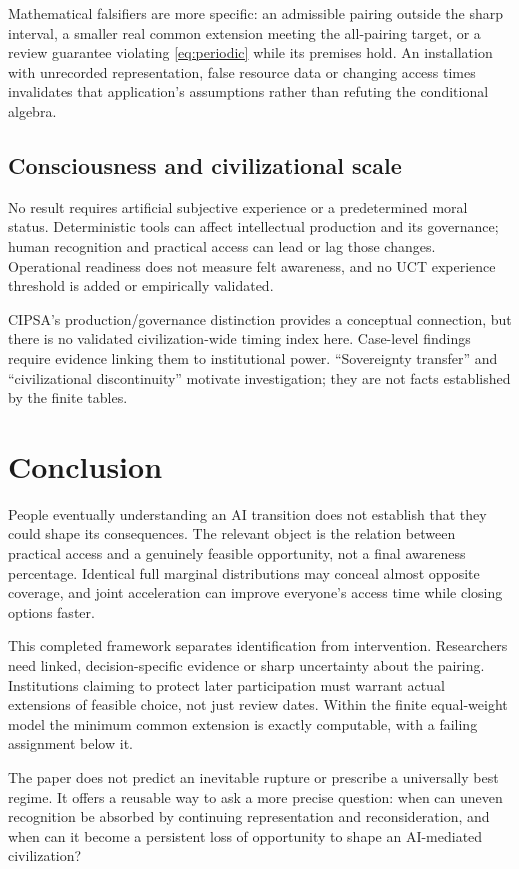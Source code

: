 \documentclass[11pt,a4paper]{article}
\theoremstyle{definition}\newtheorem{definition}{Definition}
\begin{document}
Mathematical falsifiers are more specific: an admissible pairing outside the sharp interval, a smaller real common extension meeting the all-pairing target, or a review guarantee violating \cref{eq:periodic} while its premises hold. An installation with unrecorded representation, false resource data or changing access times invalidates that application's assumptions rather than refuting the conditional algebra.

\subsection{Consciousness and civilizational scale}
No result requires artificial subjective experience or a predetermined moral status. Deterministic tools can affect intellectual production and its governance; human recognition and practical access can lead or lag those changes. Operational readiness does not measure felt awareness, and no UCT experience threshold is added or empirically validated.

CIPSA's production/governance distinction provides a conceptual connection, but there is no validated civilization-wide timing index here. Case-level findings require evidence linking them to institutional power. ``Sovereignty transfer'' and ``civilizational discontinuity'' motivate investigation; they are not facts established by the finite tables.

\section{Conclusion}
People eventually understanding an AI transition does not establish that they could shape its consequences. The relevant object is the relation between practical access and a genuinely feasible opportunity, not a final awareness percentage. Identical full marginal distributions may conceal almost opposite coverage, and joint acceleration can improve everyone's access time while closing options faster.

This completed framework separates identification from intervention. Researchers need linked, decision-specific evidence or sharp uncertainty about the pairing. Institutions claiming to protect later participation must warrant actual extensions of feasible choice, not just review dates. Within the finite equal-weight model the minimum common extension is exactly computable, with a failing assignment below it.

The paper does not predict an inevitable rupture or prescribe a universally best regime. It offers a reusable way to ask a more precise question: when can uneven recognition be absorbed by continuing representation and reconsideration, and when can it become a persistent loss of opportunity to shape an AI-mediated civilization?
\end{document}
